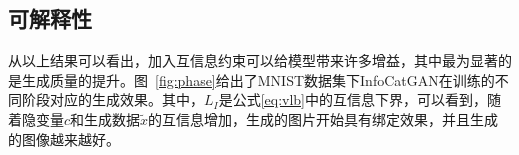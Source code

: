 
\subsection{可解释性}
从以上结果可以看出，加入互信息约束可以给模型带来许多增益，其中最为显著的是生成质量的提升。图~\ref{fig:phase}给出了MNIST数据集下InfoCatGAN在训练的不同阶段对应的生成效果。其中，$L_I$是公式\eqref{eq:vlb}中的互信息下界，可以看到，随着隐变量$c$和生成数据$\tilde{x}$的互信息增加，生成的图片开始具有绑定效果，并且生成的图像越来越好。

